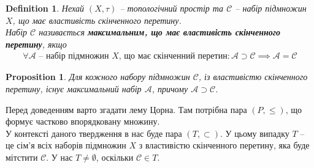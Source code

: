 \documentclass[a4paper, 10pt]{article}
\theoremstyle{theoremdd}
\newtheorem{definition}[theorem]{Definition}
\newtheorem{proposition}[theorem]{Proposition}
\begin{document}
\begin{definition}
Нехай $(X,\tau)$ -- топологічний простір та $\mathcal{C}$ -- набір підмножин $X$, що має властивість скінченного перетину.\\
Набір $\mathcal{C}$ називається \textbf{максимальним, що має властивість скінченного перетину}, якщо
\begin{align*}
\forall \mathcal{A} \text{ -- набір підмножин $X$, що має скінченний перетин}: \mathcal{A} \supset \mathcal{C} \implies \mathcal{A} = \mathcal{C}
\end{align*}
\end{definition}

\begin{proposition}
\label{maximal_collection_with_FIP}
Для кожного набору підмножин $\mathcal{C}$, із властивістю скінченного перетину, існує максимальний набір $\mathcal{A}$, причому $\mathcal{A} \supset \mathcal{C}$.
\end{proposition}
\noindent
Перед доведенням варто згадати лему Цорна. Там потрібна пара $(P, \leq)$, що формує частково впорядковану множину.\\
У контексті даного твердження в нас буде пара $(T, \subset)$. У цьому випадку $T$ -- це сім'я всіх наборів підмножин $X$ з властивістю скінченного перетину, яка буде мітстити $\mathcal{C}$. У нас $T \neq \emptyset$, оскільки $\mathcal{C} \in T$.
\end{document}
